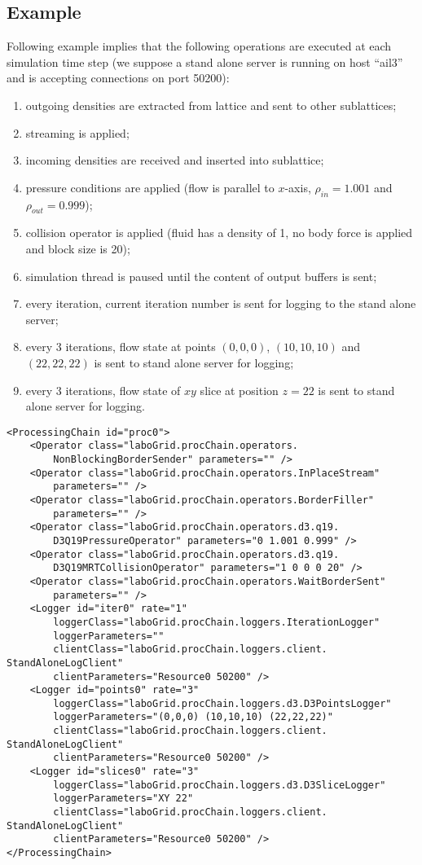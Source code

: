 \subsection{Example}

Following example implies that the following operations are executed at each
simulation time step (we suppose a stand alone server is running on host
``ail3'' and is accepting connections on port 50200):

\begin{enumerate}
	\item outgoing densities are extracted from lattice and sent to other
	sublattices;
	\item streaming is applied;
	\item incoming densities are received and inserted into sublattice;
	\item pressure conditions are applied (flow is parallel to $x$-axis,
	$\rho_{in} = 1.001$ and $\rho_{out} = 0.999$);
	\item collision operator is applied (fluid has a density of 1, no body force
	is applied and block size is 20);
	\item simulation thread is paused until the content of output buffers is sent;
	\item every iteration, current iteration number is sent for logging to the
	stand alone server;
	\item every 3 iterations, flow state at points $(0,0,0)$, $(10,10,10)$ and
	$(22,22,22)$ is sent to stand alone server for logging;
	\item every 3 iterations, flow state of $xy$ slice at position $z=22$
	is sent to stand alone server for logging.
\end{enumerate}

\begin{Verbatim}[tabsize=2,frame=lines]
<ProcessingChain id="proc0">
	<Operator class="laboGrid.procChain.operators.
		NonBlockingBorderSender" parameters="" />
	<Operator class="laboGrid.procChain.operators.InPlaceStream"
		parameters="" />
	<Operator class="laboGrid.procChain.operators.BorderFiller"
		parameters="" />
	<Operator class="laboGrid.procChain.operators.d3.q19.
		D3Q19PressureOperator" parameters="0 1.001 0.999" />
	<Operator class="laboGrid.procChain.operators.d3.q19.
		D3Q19MRTCollisionOperator" parameters="1 0 0 0 20" />
	<Operator class="laboGrid.procChain.operators.WaitBorderSent"
		parameters="" />
	<Logger id="iter0" rate="1"
		loggerClass="laboGrid.procChain.loggers.IterationLogger"
		loggerParameters=""
		clientClass="laboGrid.procChain.loggers.client.
StandAloneLogClient"
		clientParameters="Resource0 50200" />
	<Logger id="points0" rate="3"
		loggerClass="laboGrid.procChain.loggers.d3.D3PointsLogger"
		loggerParameters="(0,0,0) (10,10,10) (22,22,22)"
		clientClass="laboGrid.procChain.loggers.client.
StandAloneLogClient"
		clientParameters="Resource0 50200" />
	<Logger id="slices0" rate="3"
		loggerClass="laboGrid.procChain.loggers.d3.D3SliceLogger"
		loggerParameters="XY 22"
		clientClass="laboGrid.procChain.loggers.client.
StandAloneLogClient"
		clientParameters="Resource0 50200" />
</ProcessingChain>
\end{Verbatim}


